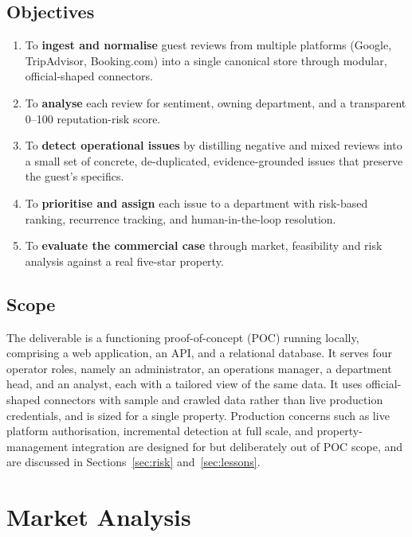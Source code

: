 \documentclass[11pt,a4paper]{article}
\begin{document}
\subsection{Objectives}
\begin{enumerate}[label=\textbf{O\arabic*.}]
  \item To \textbf{ingest and normalise} guest reviews from multiple platforms (Google, TripAdvisor,
        Booking.com) into a single canonical store through modular, official-shaped connectors.
  \item To \textbf{analyse} each review for sentiment, owning department, and a transparent 0--100
        reputation-risk score.
  \item To \textbf{detect operational issues} by distilling negative and mixed reviews into a small set
        of concrete, de-duplicated, evidence-grounded issues that preserve the guest's specifics.
  \item To \textbf{prioritise and assign} each issue to a department with risk-based ranking, recurrence
        tracking, and human-in-the-loop resolution.
  \item To \textbf{evaluate the commercial case} through market, feasibility and risk analysis against a
        real five-star property.
\end{enumerate}

\subsection{Scope}
The deliverable is a functioning proof-of-concept (POC) running locally, comprising a web application,
an API, and a relational database. It serves four operator roles, namely an administrator, an
operations manager, a department head, and an analyst, each with a tailored view of the same data. It
uses official-shaped connectors with sample and crawled data rather than live production credentials,
and is sized for a single property. Production concerns such as live platform authorisation,
incremental detection at full scale, and property-management integration are designed for but
deliberately out of POC scope, and are discussed in Sections~\ref{sec:risk} and~\ref{sec:lessons}.

\section{Market Analysis}
\label{sec:market}
\end{document}
